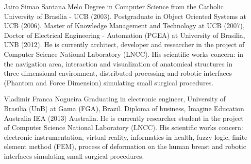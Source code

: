 \documentclass[journal]{IEEEtran}
\begin{document}
\begin{IEEEbiography}{Jairo Simao Santana Melo}
Degree in Computer Science from the Catholic University of Brasilia - UCB (2003). Postgraduate in Object Oriented Systems at UCB (2006). Master of Knowledge Management and Technology at UCB (2007), Doctor of Electrical Engineering - Automation (PGEA) at University of Brasilia, UNB (2012). He is currently architect, developer and researcher in the project of Computer Science National Laboratory (LNCC). His scientific works concern: in the navigation area, interaction and visualization of anatomical structures in three-dimensional environment, distributed processing and robotic interfaces (Phantom and Force Dimension) simulating small surgical procedures.
\end{IEEEbiography}

\begin{IEEEbiography}{Vladimir Franca Nogueira}
	Graduating in electronic engineer, University of Brasilia (UnB) at Gama (FGA), Brazil. 
	Diploma of business, Imagine Education Australia IEA (2013) Australia. 
	He is currently researcher student in the project of Computer Science National Laboratory (LNCC). 
	His scientific works concern: electronic instrumentation, virtual reality, informatics in health, 
	fuzzy logic, finite element method (FEM), process of deformation on the human breast and robotic 
	interfaces simulating small surgical procedures.
\end{IEEEbiography}
\end{document}
